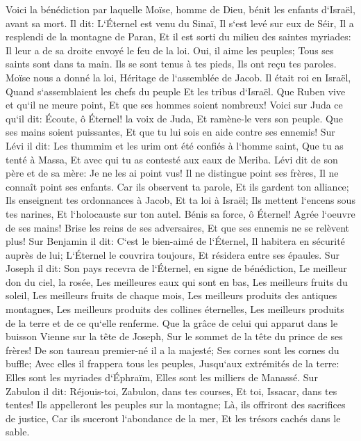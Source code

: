 \verse Voici la bénédiction par laquelle Moïse, homme de Dieu, bénit les enfants d`Israël, avant sa mort. 
\verse Il dit: L`Éternel est venu du Sinaï, Il s`est levé sur eux de Séir, Il a resplendi de la montagne de Paran, Et il est sorti du milieu des saintes myriades: Il leur a de sa droite envoyé le feu de la loi. 
\verse Oui, il aime les peuples; Tous ses saints sont dans ta main. Ils se sont tenus à tes pieds, Ils ont reçu tes paroles. 
\verse Moïse nous a donné la loi, Héritage de l`assemblée de Jacob. 
\verse Il était roi en Israël, Quand s`assemblaient les chefs du peuple Et les tribus d`Israël. 
\verse Que Ruben vive et qu`il ne meure point, Et que ses hommes soient nombreux! 
\verse Voici sur Juda ce qu`il dit: Écoute, ô Éternel! la voix de Juda, Et ramène-le vers son peuple. Que ses mains soient puissantes, Et que tu lui sois en aide contre ses ennemis! 
\verse Sur Lévi il dit: Les thummim et les urim ont été confiés à l`homme saint, Que tu as tenté à Massa, Et avec qui tu as contesté aux eaux de Meriba. 
\verse Lévi dit de son père et de sa mère: Je ne les ai point vus! Il ne distingue point ses frères, Il ne connaît point ses enfants. Car ils observent ta parole, Et ils gardent ton alliance; 
\verse Ils enseignent tes ordonnances à Jacob, Et ta loi à Israël; Ils mettent l`encens sous tes narines, Et l`holocauste sur ton autel. 
\verse Bénis sa force, ô Éternel! Agrée l`oeuvre de ses mains! Brise les reins de ses adversaires, Et que ses ennemis ne se relèvent plus! 
\verse Sur Benjamin il dit: C`est le bien-aimé de l`Éternel, Il habitera en sécurité auprès de lui; L`Éternel le couvrira toujours, Et résidera entre ses épaules. 
\verse Sur Joseph il dit: Son pays recevra de l`Éternel, en signe de bénédiction, Le meilleur don du ciel, la rosée, Les meilleures eaux qui sont en bas, 
\verse Les meilleurs fruits du soleil, Les meilleurs fruits de chaque mois, 
\verse Les meilleurs produits des antiques montagnes, Les meilleurs produits des collines éternelles, 
\verse Les meilleurs produits de la terre et de ce qu`elle renferme. Que la grâce de celui qui apparut dans le buisson Vienne sur la tête de Joseph, Sur le sommet de la tête du prince de ses frères! 
\verse De son taureau premier-né il a la majesté; Ses cornes sont les cornes du buffle; Avec elles il frappera tous les peuples, Jusqu`aux extrémités de la terre: Elles sont les myriades d`Éphraïm, Elles sont les milliers de Manassé. 
\verse Sur Zabulon il dit: Réjouis-toi, Zabulon, dans tes courses, Et toi, Issacar, dans tes tentes! 
\verse Ils appelleront les peuples sur la montagne; Là, ils offriront des sacrifices de justice, Car ils suceront l`abondance de la mer, Et les trésors cachés dans le sable. 
